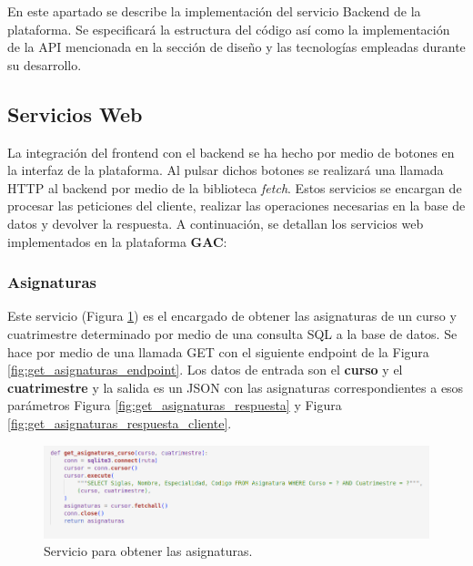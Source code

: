 En este apartado se describe la implementación del servicio Backend de la plataforma. Se especificará la estructura del código así como la implementación de la API mencionada en la sección de diseño y las tecnologías empleadas durante su desarrollo.\newline

\subsection{Servicios Web}

La integración del frontend con el backend se ha hecho por medio de botones en la interfaz de la plataforma. Al pulsar dichos botones se realizará una llamada HTTP al backend por medio de la biblioteca \textit{fetch}. Estos servicios se encargan de procesar las peticiones del cliente, realizar las operaciones necesarias en la base de datos y devolver la respuesta. A continuación, se detallan los servicios web implementados en la plataforma \textbf{GAC}:

\subsubsection*{Asignaturas}

Este servicio (Figura \ref{fig:get_asignaturas_curso}) es el encargado de obtener las asignaturas de un curso y cuatrimestre determinado por medio de una consulta SQL a la base de datos. Se hace por medio de una llamada GET con el siguiente endpoint de la Figura \ref{fig:get_asignaturas_endpoint}. Los datos de entrada son el \textbf{curso} y el \textbf{cuatrimestre} y la salida es un JSON con las asignaturas correspondientes a esos parámetros Figura \ref{fig:get_asignaturas_respuesta} y Figura \ref{fig:get_asignaturas_respuesta_cliente}.

\begin{figure}[H]
    \centering
    \includegraphics[width=1\textwidth]{./imagenes/get_asignaturas_curso.png}
    \caption{Servicio para obtener las asignaturas.}
    \label{fig:get_asignaturas_curso}
\end{figure}



